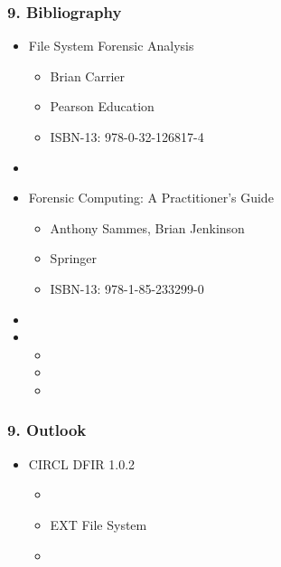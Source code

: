 \begin{frame}
  \frametitle{9. Bibliography}
  \begin{itemize}
      \item File System Forensic Analysis
        \begin{itemize}
            \item[] Brian Carrier
            \item[] Pearson Education
            \item[] ISBN-13: 978-0-32-126817-4
        \end{itemize}
      \item[]
      \item Forensic Computing: A Practitioner’s Guide
        \begin{itemize}
            \item[] Anthony Sammes, Brian Jenkinson
            \item[] Springer
            \item[] ISBN-13: 978-1-85-233299-0
        \end{itemize}
      \item[]
      \item[] 
        \begin{itemize}
            \item[]
            \item[]
            \item[] 
        \end{itemize}
  \end{itemize}
\end{frame}


\begin{frame}
  \frametitle{9. Outlook}
  \begin{itemize}
      \item[] CIRCL DFIR 1.0.2
      \begin{itemize}
          \item[]
          \item[] EXT File System
          \item[]
      \end{itemize}
  \end{itemize}
\end{frame}



